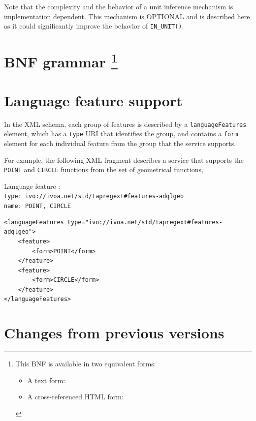 \documentclass[11pt,a4paper]{ivoa}
\begin{document}
Note that the complexity and the behavior of a unit inference mechanism is
implementation dependent. This mechanism is OPTIONAL and is described here
as it could significantly improve the behavior of \verb:IN_UNIT():.

\clearpage %
\appendix
\section[BNF grammar]{BNF grammar \footnote{
This BNF is available in two equivalent forms:
\begin{itemize}
    \item A text form: 
    \item A cross-referenced HTML form: 
\end{itemize}
}}
\label{sec:grammar}



\clearpage %
\section{Language feature support}
\label{sec:features}

In the \TAPRegSpec{} XML schema, each group of features is
described by a \verb:languageFeatures: element, which has a \verb:type:
URI that identifies the group, and contains a \verb:form: element for each
individual feature from the group that the service supports.

For example, the following XML fragment describes a service that supports the
\verb:POINT: and \verb:CIRCLE: functions from the set of geometrical functions,

{\footnotesize Language feature :}\\
{\footnotesize \verb|type: ivo://ivoa.net/std/tapregext#features-adqlgeo|}\\
{\footnotesize \verb|name: POINT, CIRCLE|}\\

\begin{verbatim}
<languageFeatures type="ivo://ivoa.net/std/tapregext#features-adqlgeo">
    <feature>
        <form>POINT</form>
    </feature>
    <feature>
        <form>CIRCLE</form>
    </feature>
</languageFeatures>
\end{verbatim}

\clearpage %
\section{Changes from previous versions}
\label{sec:changes}
\end{document}
